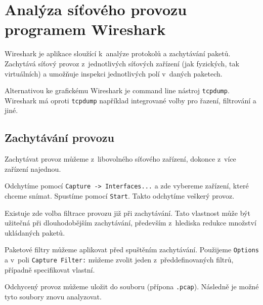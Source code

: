 
\section{Analýza síťového provozu programem Wireshark}
\label{wireshark}

Wireshark je aplikace sloužící k~analýze protokolů a zachytávání paketů. Zachytává síťový provoz z~jednotlivých síťových zařízení (jak fyzických, tak virtuálních) a umožňuje inspekci jednotlivých polí v~daných paketech.

Alternativou ke grafickému Wireshark je command line nástroj \texttt{tcpdump}. Wireshark má oproti \texttt{tcpdump} například integrované volby pro řazení, filtrování a jiné.


\subsection{Zachytávání provozu}
Zachytávat provoz můžeme z~libovolného síťového zařízení, dokonce z~více zařízení najednou.

Odchytíme pomocí \texttt{Capture -> Interfaces...} a zde vybereme zařízení, které chceme snímat. Spustíme pomocí \texttt{Start}. Takto odchytíme veškerý provoz.

Existuje zde volba filtrace provozu již při zachytávání. Tato vlastnost může být užitečná při dlouhodobějším zachytávání, především z~hlediska redukce množství ukládaných paketů.

Paketové filtry můžeme aplikovat před spuštěním zachytávání. Použijeme \texttt{Options} a v~poli \texttt{Capture Filter:} můžeme zvolit jeden z~předdefinovaných filtrů, případně specifikovat vlastní.

Odchycený provoz můžeme uložit do souboru (přípona \texttt{.pcap}). Následně je možné tyto soubory znovu analyzovat.


